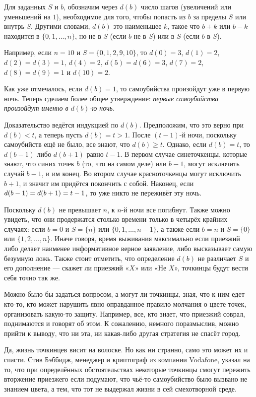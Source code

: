 Для заданных $S$ и $b$, обозначим через $d(b)$ число шагов (увеличений или уменьшений на $1$), необходимое для того, чтобы попасть из $b$ за пределы $S$ или внутрь $S$.
Другими словами, $d(b)$ это наименьшее $k$, такое что $b+k$ или $b-k$ находится в $\{0, 1, \dots, n\}$, но не в $S$ (если $b$ не в  $S$) или в $S$ (если $b$ в $S$).

Например, если $n=10$ и 
$S=\{0,1,2,9,10\}$, то 
$d(0)=3$, 
$d(1)=2$, 
$d(2)=d(3)=1$, 
$d(4)=2$, 
$d(5)=d(6)=3$, 
$d(7)=2$, 
$d(8)=d(9)=1$ и
$d(10)=2$.

Как уже отмечалось, если $d(b)=1$, то самоубийства произойдут уже в первую ночь.
Теперь сделаем более общее утверждение: \emph{первые самоубийства произойдут именно в $d(b)$-ю ночь}.

Доказательство ведётся индукцией по $d(b)$.
Предположим, что это верно при $d(b)<t$, а теперь пусть $d(b)=t>1$.
После $(t-1)$-й ночи, поскольку самоубийств ещё не было, все знают, что $d(b)\ge t$.
Однако, если $d(b)=t$, то $d(b-1)$ либо $d(b+1)$ равно $t-1$.
В первом случае синеточкенцы, которые знают, что синих точек $b$ (то, что на самом деле) или $b-1$, 
могут исключить случай $b-1$, и им конец.
Во втором случае красноточкенцы могут исключить $b+1$, и значит им придётся покончить с собой.
Наконец, если $d(b-1)\z=d(b+1)=t-1$, то уже никто не переживёт эту ночь.

Поскольку $d(b)$ не превышает $n$, к $n$-й ночи все погибнут.
Также можно увидеть, что они продержатся столько времени только в четырёх крайних случаях:
если $b=0$ и $S=\{n\}$ или $\{0,1,\dots,n-1\}$,
а также если $b=n$ и $S=\{0\}$ или $\{1,2,\dots,n\}$.
Иначе говоря, время выживания максимально если приезжий либо делает наименее информативное верное заявление,
либо высказывает самую безумную ложь.
Также стоит отметить, что определение $d(b)$ не различает 
$S$ и его дополнение --- скажет ли приезжий «$X$» или «Не $X$», точкинцы будут вести себя точно так же.

Можно было бы задаться вопросом, а могут ли точкинцы, зная, что к ним едет кто-то, кто может нарушить явно оправданное правило молчания о цвете точек, организовать какую-то защиту.
Например, все, кто знает, что приезжий соврал, поднимаются и говорят об этом.
К сожалению, немного поразмыслив, можно прийти к выводу, что ни эта, ни какая-либо другая стратегия не спасёт город.

Да, жизнь точкинцев висит на волоске.
Но как ни странно, само это может их и спасти.
Стив Бэббидж, менеджер и криптограф из компании Vodafone, указал на то, что при определённых обстоятельствах некоторые точкинцы смогут пережить вторжение приезжего если подумают, что чьё-то самоубийство было вызвано не знанием цвета, а тем, что тот не выдержал жизни в сей смехотворной среде.

